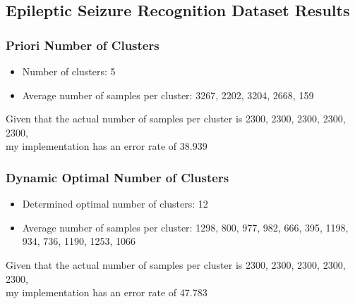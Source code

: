 \begin{flushleft}
    \subsection{Epileptic Seizure Recognition Dataset Results}
        \subsubsection{Priori Number of Clusters}
            \begin{itemize}
                \item Number of clusters: 5
                \item Average number of samples per cluster: {3267, 2202, 3204, 2668, 159}
            \end{itemize}
            Given that the actual number of samples per cluster is {2300, 2300, 2300, 2300, 2300}, \\
            my implementation has an error rate of 38.939%
        \subsubsection{Dynamic Optimal Number of Clusters}
            \begin{itemize}
                \item Determined optimal number of clusters: 12
                \item Average number of samples per cluster: {1298, 800, 977, 982, 666, 395, 1198, 934, 736, 1190, 1253, 1066}
            \end{itemize}
            Given that the actual number of samples per cluster is {2300, 2300, 2300, 2300, 2300}, \\
            my implementation has an error rate of 47.783%
\end{flushleft}
